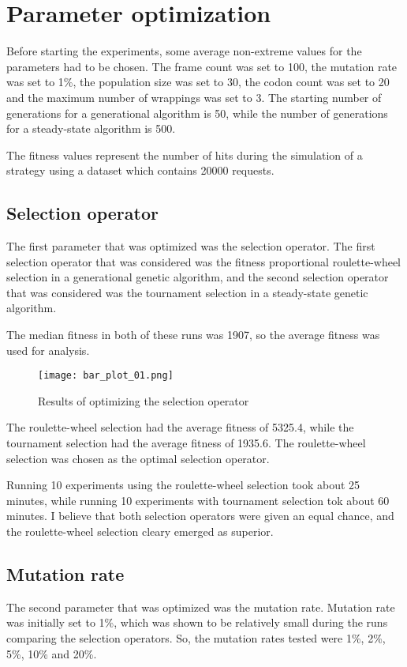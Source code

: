 \section{Parameter optimization}
Before starting the experiments, some average non-extreme values for the parameters had to be chosen. The frame count was set to 100, the mutation rate was set to 1\%, the population size was set to 30, the codon count was set to 20 and the maximum number of wrappings was set to 3. The starting number of generations for a generational algorithm is 50, while the number of generations for a steady-state algorithm is 500.

The fitness values represent the number of hits during the simulation of a strategy using a dataset which contains 20000 requests.

\subsection{Selection operator}
The first parameter that was optimized was the selection operator. The first selection operator that was considered was the fitness proportional roulette-wheel selection in a generational genetic algorithm, and the second selection operator that was considered was the tournament selection in a steady-state genetic algorithm.

The median fitness in both of these runs was 1907, so the average fitness was used for analysis.

\begin{figure}[H]
	\centering
	\texttt{[image: bar\_plot\_01.png]}
	\caption{Results of optimizing the selection operator}
\end{figure}

The roulette-wheel selection had the average fitness of 5325.4, while the tournament selection had the average fitness of 1935.6. The roulette-wheel selection was chosen as the optimal selection operator.

Running 10 experiments using the roulette-wheel selection took about 25 minutes, while running 10 experiments with tournament selection tok about 60 minutes. I believe that both selection operators were given an equal chance, and the roulette-wheel selection cleary emerged as superior.

\subsection{Mutation rate}
The second parameter that was optimized was the mutation rate. Mutation rate was initially set to 1\%, which was shown to be relatively small during the runs comparing the selection operators. So, the mutation rates tested were 1\%, 2\%, 5\%, 10\% and 20\%.

